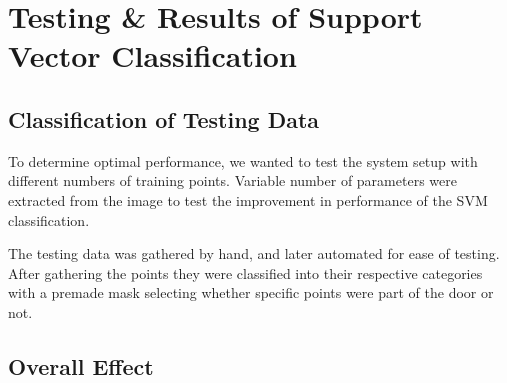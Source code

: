 \chapter {Testing \& Results of Support Vector Classification}

\section{Classification of Testing Data}
To determine optimal performance, we wanted to test the system setup with different numbers of training points. Variable number of parameters were extracted from the image to test the improvement in performance of the SVM classification.

The testing data was gathered by hand, and later automated for ease of testing. After gathering the points they were classified into their respective categories with a premade mask selecting whether specific points were part of the door or not.

\section{Overall Effect}

